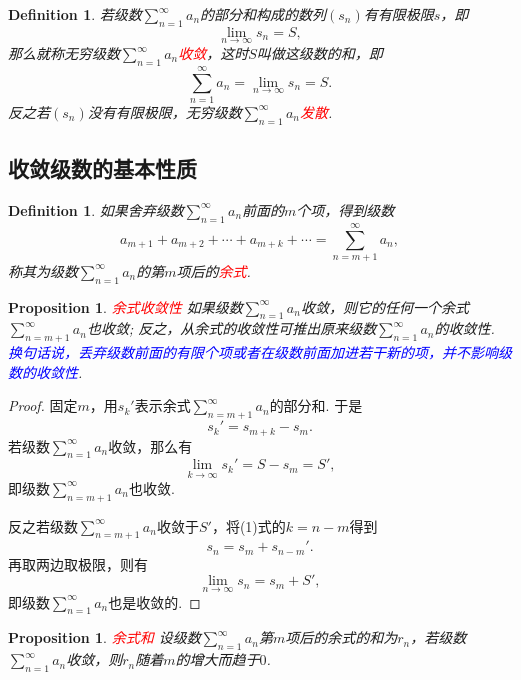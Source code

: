 \documentclass{article}
\newtheorem{proposition}[theorem]{Proposition}
\newtheorem{definition}[theorem]{Definition}
\newcommand{\redt}[1]{\textcolor{red}{#1}}
\newcommand{\bluet}[1]{\textcolor{blue}{#1}}
\begin{document}
\begin{definition}
\rm 若级数$\sum\limits_{n=1}^\infty a_n$的部分和构成的数列$(s_n)$有有限极限$s$，即
$$
\lim\limits_{n \to \infty} s_n = S,
$$
那么就称无穷级数$\sum\limits_{n=1}^\infty a_n$\redt{收敛}，这时$S$叫做这级数的和，即
$$
\sum\limits_{n=1}^\infty a_n = \lim\limits_{n \to \infty} s_n = S.
$$
反之若$(s_n)$没有有限极限，无穷级数$\sum\limits_{n=1}^\infty a_n$\redt{发散}.
\end{definition}

\subsection{收敛级数的基本性质}

\begin{definition}
\rm 如果舍弃级数$\sum\limits_{n=1}^\infty a_n$前面的$m$个项，得到级数
$$
a_{m+1} + a_{m+2} + \cdots + a_{m+k} + \cdots = \sum\limits_{n=m+1}^\infty a_n,
$$
称其为级数$\sum\limits_{n=1}^\infty a_n$的第$m$项后的\redt{余式}. 
\end{definition}

\begin{proposition}
\rm \redt{余式收敛性} 如果级数$\sum\limits_{n=1}^\infty a_n$收敛，则它的任何一个余式$\sum\limits_{n=m+1}^\infty a_n$也收敛; 反之，从余式的收敛性可推出原来级数$\sum\limits_{n=1}^\infty a_n$的收敛性. \bluet{换句话说，丢弃级数前面的有限个项或者在级数前面加进若干新的项，并不影响级数的收敛性}.
\end{proposition}

\begin{proof}
\rm 固定$m$，用$s_k'$表示余式$\sum\limits_{n=m+1}^\infty a_n$的部分和. 于是
\begin{equation}
s_k' = s_{m+k} - s_m.
\end{equation}
若级数$\sum\limits_{n=1}^\infty a_n$收敛，那么有
$$
\lim\limits_{k \to \infty}s_k' = S-s_m = S',
$$
即级数$\sum\limits_{n=m+1}^\infty a_n$也收敛. 

反之若级数$\sum\limits_{n=m+1}^\infty a_n$收敛于$S'$，将(1)式的$k=n-m$得到
$$
s_n = s_m + s_{n-m}'.
$$
再取两边取极限，则有
$$
\lim\limits_{n \to \infty} s_n  = s_m + S',
$$
即级数$\sum\limits_{n=1}^\infty a_n$也是收敛的. 
\end{proof}

\begin{proposition}
\rm \redt{余式和} 设级数$\sum\limits_{n=1}^\infty a_n$第$m$项后的余式的和为$r_n$，若级数$\sum\limits_{n=1}^\infty a_n$收敛，则$r_n$随着$m$的增大而趋于$0$.
\end{proposition}
\end{document}
